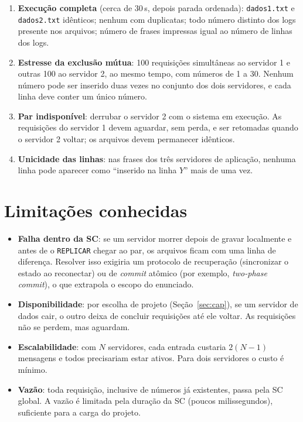 \documentclass[11pt,a4paper]{article}
\newcommand{\msg}[1]{\texttt{#1}}
\begin{document}
\begin{enumerate}
  \item \textbf{Execução completa} (cerca de 30\,s, depois parada ordenada):
        \texttt{dados1.txt} e \texttt{dados2.txt} idênticos; nenhum com duplicatas;
        todo número distinto dos logs presente nos arquivos; número de frases
        impressas igual ao número de linhas dos logs.
  \item \textbf{Estresse da exclusão mútua}: 100 requisições simultâneas ao
        servidor 1 e outras 100 ao servidor 2, ao mesmo tempo, com números de 1 a
        30. Nenhum número pode ser inserido duas vezes no conjunto dos dois
        servidores, e cada linha deve conter um único número.
  \item \textbf{Par indisponível}: derrubar o servidor 2 com o sistema em execução.
        As requisições do servidor 1 devem aguardar, sem perda, e ser retomadas
        quando o servidor 2 voltar; os arquivos devem permanecer idênticos.
  \item \textbf{Unicidade das linhas}: nas frases dos três servidores de aplicação,
        nenhuma linha pode aparecer como ``inserido na linha $Y$'' mais de uma vez.
\end{enumerate}

\section{Limitações conhecidas}
\label{sec:limitacoes}

\begin{itemize}
  \item \textbf{Falha dentro da SC}: se um servidor morrer depois de gravar
        localmente e antes de o \msg{REPLICAR} chegar ao par, os arquivos ficam com
        uma linha de diferença. Resolver isso exigiria um protocolo de recuperação
        (sincronizar o estado ao reconectar) ou de \emph{commit} atômico (por
        exemplo, \emph{two-phase commit}), o que extrapola o escopo do enunciado.
  \item \textbf{Disponibilidade}: por escolha de projeto (Seção~\ref{sec:cap}), se um
        servidor de dados cair, o outro deixa de concluir requisições até ele
        voltar. As requisições não se perdem, mas aguardam.
  \item \textbf{Escalabilidade}: com $N$ servidores, cada entrada custaria
        $2(N-1)$ mensagens e todos precisariam estar ativos. Para dois servidores
        o custo é mínimo.
  \item \textbf{Vazão}: toda requisição, inclusive de números já existentes, passa
        pela SC global. A vazão é limitada pela duração da SC (poucos
        milissegundos), suficiente para a carga do projeto.
\end{itemize}
\end{document}
